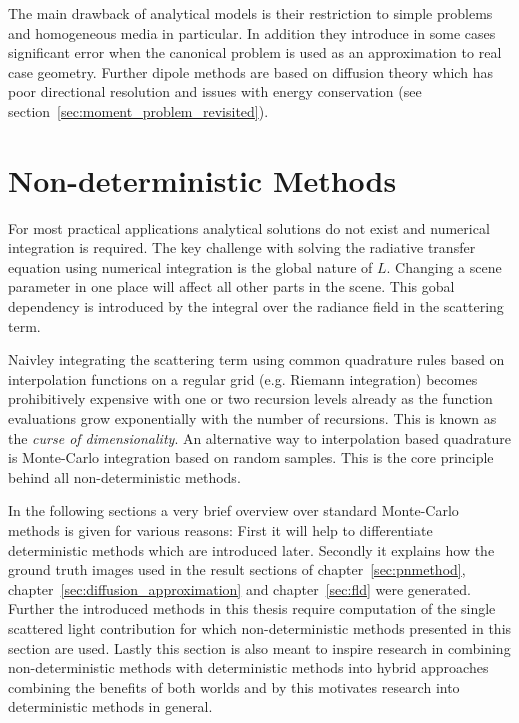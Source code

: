 The main drawback of analytical models is their restriction to simple problems and homogeneous media in particular. In addition they introduce in some cases significant error when the canonical problem is used as an approximation to real case geometry. Further dipole methods are based on diffusion theory which has poor directional resolution and issues with energy conservation (see section~\ref{sec:moment_problem_revisited}).

\section{Non-deterministic Methods}
\label{sec:foundations_mc}

For most practical applications analytical solutions do not exist and numerical integration is required. The key challenge with solving the radiative transfer equation using numerical integration is the global nature of $L$. Changing a scene parameter in one place will affect all other parts in the scene. This gobal dependency is introduced by the integral over the radiance field in the scattering term. 

Naivley integrating the scattering term using common quadrature rules based on interpolation functions on a regular grid (e.g. Riemann integration) becomes prohibitively expensive with one or two recursion levels already as the function evaluations grow exponentially with the number of recursions. This is known as the \emph{curse of dimensionality}. An alternative way to interpolation based quadrature is Monte-Carlo integration based on random samples. This is the core principle behind all non-deterministic methods.

In the following sections a very brief overview over standard Monte-Carlo methods is given for various reasons: First it will help to differentiate deterministic methods which are introduced later. Secondly it explains how the ground truth images used in the result sections of chapter~\ref{sec:pnmethod}, chapter~\ref{sec:diffusion_approximation} and chapter~\ref{sec:fld} were generated. Further the introduced methods in this thesis require computation of the single scattered light contribution for which non-deterministic methods presented in this section are used. Lastly this section is also meant to inspire research in combining non-deterministic methods with deterministic methods into hybrid approaches combining the benefits of both worlds and by this motivates research into deterministic methods in general.

